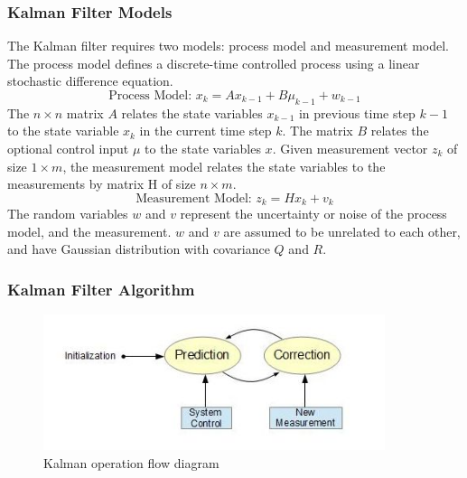 \subsubsection{Kalman Filter Models}

The Kalman filter requires two models: process model and measurement
model. The process model defines a discrete-time controlled process
using a linear stochastic difference equation.
\begin{equation}
\text{Process Model: }x_k = Ax_{k-1}+B\mu_{k-1}+w_{k-1}
\end{equation}
\noindent The $n\times n$ matrix $A$ relates the state variables
$x_{k-1}$ in previous time step $k-1$ to the state variable $x_{k}$ in
the current time step $k$. The matrix $B$ relates the optional control
input $\mu$ to the state variables $x$. Given measurement vector $z_k$
of size $1 \times m$, the measurement model relates the state
variables to the measurements by matrix H of size $n \times m$. 
\begin{equation}
\text{Measurement Model: }z_k = Hx_k+v_k
\end{equation}
The random variables $w$ and $v$ represent the uncertainty or noise of
the process model, and the measurement. $w$ and $v$ are assumed to be
unrelated to each other, and have Gaussian distribution with covariance
$Q$ and $R$.

\subsubsection{Kalman Filter Algorithm}
\begin{figure}[h]
\centering
\includegraphics[width=10cm, keepaspectratio=true]{./Figures/KalmanOperation.jpg}
\caption{Kalman operation flow diagram}
\label{figch2:1}
\end{figure}


